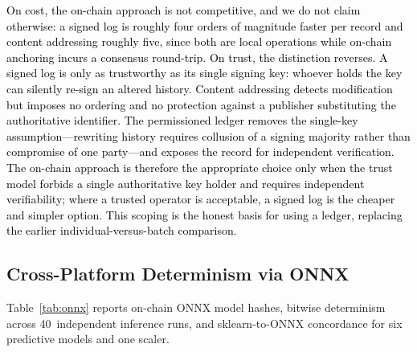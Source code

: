 \documentclass[conference]{IEEEtran}
\newcommand{\rev}[2]{#2}
\begin{document}
\textcolor{black}{On cost, the on-chain approach is not competitive,
and we do not claim otherwise: a signed log is roughly four
orders of magnitude faster per record and content addressing
roughly five, since both are local operations while on-chain
anchoring incurs a consensus round-trip. On trust, the
distinction reverses. A signed log is only as trustworthy as
its single signing key: whoever holds the key can silently
re-sign an altered history. Content addressing detects
modification but imposes no ordering and no protection against a
publisher substituting the authoritative identifier. The
permissioned ledger removes the single-key assumption---rewriting
history requires collusion of a signing majority rather than
compromise of one party---and exposes the record for independent
verification. The on-chain approach is therefore the appropriate
choice only when the trust model forbids a single authoritative
key holder and requires independent verifiability; where a
trusted operator is acceptable, a signed log is the cheaper and
simpler option. This scoping is the honest basis for using a
ledger, replacing the earlier individual-versus-batch
comparison.}
\subsection{\textbf{Cross-Platform Determinism via ONNX}}
\label{sec:onnx-results}

Table~\ref{tab:onnx} reports on-chain ONNX model hashes,
bitwise determinism across 40~independent inference runs,
and sklearn-to-ONNX concordance for \rev{R2.1}{six predictive models and one scaler}.
\end{document}
